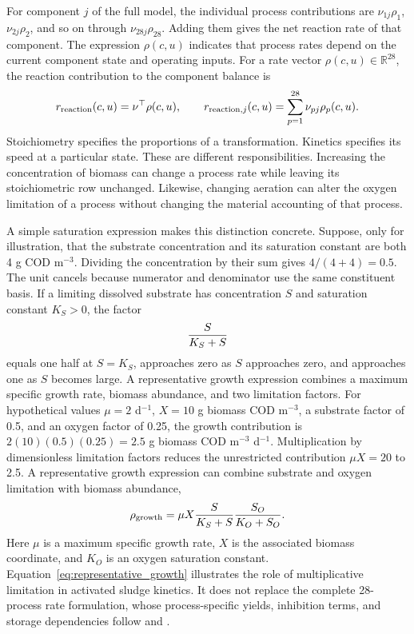 For component $j$ of the full model, the individual process contributions are $\nu_{1j}\rho_1$, $\nu_{2j}\rho_2$, and so on through $\nu_{28j}\rho_{28}$. Adding them gives the net reaction rate of that component. The expression $\rho(c,u)$ indicates that process rates depend on the current component state and operating inputs. For a rate vector $\rho(c,u)\in\mathbb{R}^{28}$, the reaction contribution to the component balance is
\begin{equation}
\equationname{Vector and scalar reaction contributions to component rates}
r_{\mathrm{reaction}}(c,u)=\nu^\top\rho(c,u),\qquad
r_{\mathrm{reaction},j}(c,u)=\sum_{p=1}^{28}\nu_{pj}\rho_p(c,u).
\label{eq:reaction_contribution}
\end{equation}
Stoichiometry specifies the proportions of a transformation. Kinetics specifies its speed at a particular state. These are different responsibilities. Increasing the concentration of biomass can change a process rate while leaving its stoichiometric row unchanged. Likewise, changing aeration can alter the oxygen limitation of a process without changing the material accounting of that process.

A simple saturation expression makes this distinction concrete. Suppose, only for illustration, that the substrate concentration and its saturation constant are both 4 g COD m$^{-3}$. Dividing the concentration by their sum gives $4/(4+4)=0.5$. The unit cancels because numerator and denominator use the same constituent basis. If a limiting dissolved substrate has concentration $S$ and saturation constant $K_S>0$, the factor
\begin{equation}
\equationname{Monod substrate saturation factor}
\frac{S}{K_S+S}
\label{eq:saturation_example}
\end{equation}
equals one half at $S=K_S$, approaches zero as $S$ approaches zero, and approaches one as $S$ becomes large. A representative growth expression combines a maximum specific growth rate, biomass abundance, and two limitation factors. For hypothetical values $\mu=2$ d$^{-1}$, $X=10$ g biomass COD m$^{-3}$, a substrate factor of 0.5, and an oxygen factor of 0.25, the growth contribution is $2(10)(0.5)(0.25)=2.5$ g biomass COD m$^{-3}$ d$^{-1}$. Multiplication by dimensionless limitation factors reduces the unrestricted contribution $\mu X=20$ to 2.5. A representative growth expression can combine substrate and oxygen limitation with biomass abundance,
\begin{equation}
\equationname{Representative growth rate with substrate and oxygen limitation}
\rho_{\mathrm{growth}}=
\mu X\frac{S}{K_S+S}\frac{S_O}{K_O+S_O}.
\label{eq:representative_growth}
\end{equation}
Here $\mu$ is a maximum specific growth rate, $X$ is the associated biomass coordinate, and $K_O$ is an oxygen saturation constant. Equation~\eqref{eq:representative_growth} illustrates the role of multiplicative limitation in activated sludge kinetics. It does not replace the complete 28-process rate formulation, whose process-specific yields, inhibition terms, and storage dependencies follow \citet{Henze2006} and \citet{Guerrero2011}.

